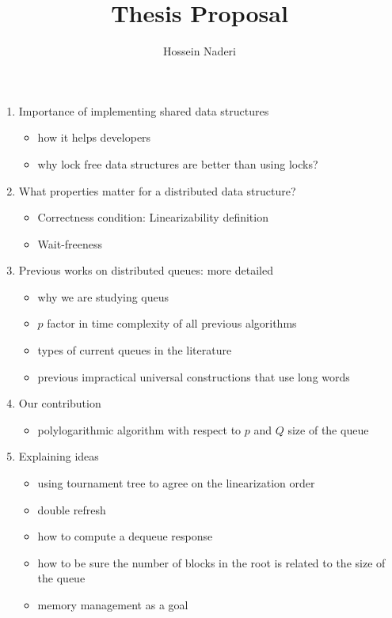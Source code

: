 \documentclass[12pt]{article}
\begin{document}
\title{Thesis Proposal}
\author{Hossein Naderi}
\maketitle

\begin{enumerate}
  \item Importance of implementing shared data structures
\begin{itemize}
  \item how it helps developers
  \item why lock free data structures are better than using locks?
\end{itemize} 
  \item  What properties matter for a distributed data structure?
\begin{itemize}
  \item Correctness condition: Linearizability definition
  \item Wait-freeness
\end{itemize} 
  \item Previous works on distributed queues: more detailed
\begin{itemize}
  \item why we are studying queus
  \item $p$ factor in time complexity of all previous algorithms
  \item types of current queues in the literature
  \item previous impractical universal constructions that use long words
\end{itemize}
  \item Our contribution
\begin{itemize}
  \item polylogarithmic algorithm with respect to $p$ and $Q$ size of the queue
\end{itemize}
  \item Explaining ideas
\begin{itemize}
  \item using tournament tree to agree on the linearization order
  \item double refresh
  \item how to compute a dequeue response
  \item how to be sure the number of blocks in the root is related to the size of the queue
  \item memory management as a goal
\end{itemize}
\end{enumerate}
\end{document}
